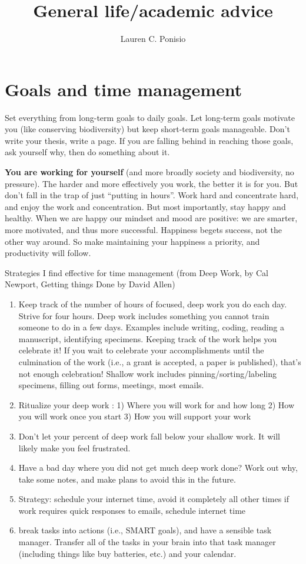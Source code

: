 \documentclass[12pt]{article}
\begin{document}
\title{General life/academic advice}
\author{Lauren C. Ponisio}

\maketitle

\section{Goals and time management}
\label{sec:goals}
Set everything from long-term goals to daily goals. Let long-term
goals motivate you (like conserving biodiversity) but keep short-term
goals manageable. Don't write your thesis, write a page.  If you are
falling behind in reaching those goals, ask yourself why, then do
something about it.

\textbf{You are working for yourself} (and more broadly society and
biodiversity, no pressure). The harder and more effectively you work,
the better it is for you. But don't fall in the trap of just ``putting
in hours''.  Work hard and concentrate hard, and enjoy the work and
concentration. But most importantly, stay happy and healthy. When we
are happy our mindset and mood are positive: we are smarter, more
motivated, and thus more successful. Happiness begets success, not the
other way around. So make maintaining your happiness a priority, and
productivity will follow. 

Strategies I find effective for time management (from Deep Work, by
Cal Newport, Getting things Done by David Allen)
\begin{enumerate}
\item Keep track of the number of hours of focused, deep work you do
  each day. Strive for four hours. Deep work includes something you
  cannot train someone to do in a few days. Examples include writing,
  coding, reading a manuscript, identifying specimens. Keeping track
  of the work helps you celebrate it! If you wait to celebrate your
  accomplishments until the culmination of the work (i.e., a grant is
  accepted, a paper is published), that's not enough celebration!
  Shallow work includes pinning/sorting/labeling specimens, filling
  out forms, meetings, most emails.
\item Ritualize your deep work : 1) Where you will work for and how
  long 2) How you will work once you start 3) How you will support
  your work
\item Don't let your percent of deep work fall below your shallow
  work. It will likely make you feel frustrated. 
\item Have a bad day where you did not get much deep work done? Work
  out why, take some notes, and make plans to avoid this in the
  future.
\item Strategy: schedule your internet time, avoid it completely all
  other times if work requires quick responses to emails, schedule
  internet time
\item break tasks into actions (i.e., SMART goals), and have a
  sensible task manager. Transfer all of the tasks in your brain into
  that task manager (including things like buy batteries, etc.) and
  your calendar.
\end{enumerate}
\end{document}
